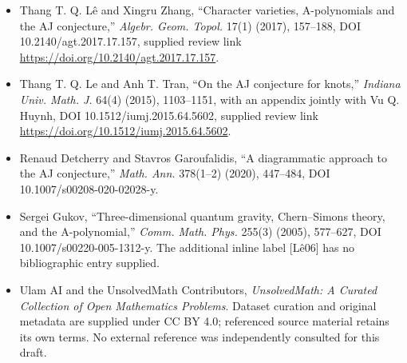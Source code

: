 \documentclass[11pt]{article}
\begin{document}
\begin{itemize}
\item [LZ17] Thang T. Q. Lê and Xingru Zhang, ``Character varieties, A-polynomials and the AJ conjecture,'' \emph{Algebr. Geom. Topol.} 17(1) (2017), 157--188, DOI 10.2140/agt.2017.17.157, supplied review link \url{https://doi.org/10.2140/agt.2017.17.157}.
\item [LT15] Thang T. Q. Le and Anh T. Tran, ``On the AJ conjecture for knots,'' \emph{Indiana Univ. Math. J.} 64(4) (2015), 1103--1151, with an appendix jointly with Vu Q. Huynh, DOI 10.1512/iumj.2015.64.5602, supplied review link \url{https://doi.org/10.1512/iumj.2015.64.5602}.
\item [DG20] Renaud Detcherry and Stavros Garoufalidis, ``A diagrammatic approach to the AJ conjecture,'' \emph{Math. Ann.} 378(1--2) (2020), 447--484, DOI 10.1007/s00208-020-02028-y.
\item [Guk05] Sergei Gukov, ``Three-dimensional quantum gravity, Chern--Simons theory, and the A-polynomial,'' \emph{Comm. Math. Phys.} 255(3) (2005), 577--627, DOI 10.1007/s00220-005-1312-y. The additional inline label [Lê06] has no bibliographic entry supplied.
\item Ulam AI and the UnsolvedMath Contributors, \emph{UnsolvedMath: A Curated Collection of Open Mathematics Problems}. Dataset curation and original metadata are supplied under CC BY 4.0; referenced source material retains its own terms. No external reference was independently consulted for this draft.
\end{itemize}
\end{document}
